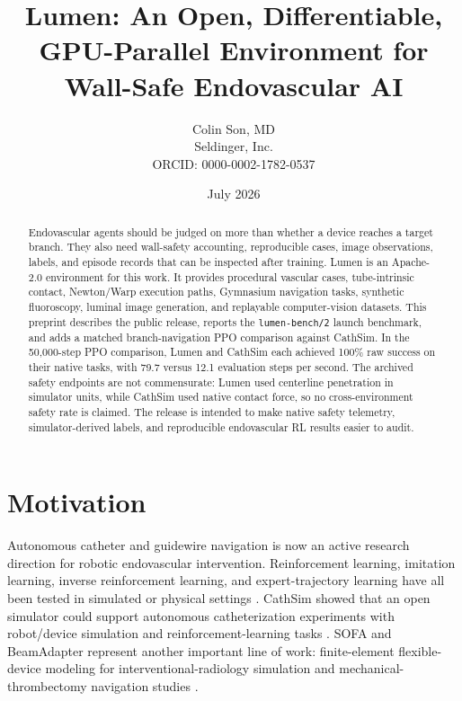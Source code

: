 \documentclass[11pt]{article}
\title{\textbf{Lumen: An Open, Differentiable, GPU-Parallel Environment for Wall-Safe Endovascular AI}}
\author{
  Colin Son, MD\\
  Seldinger, Inc.\\
  ORCID: 0000-0002-1782-0537
}
\date{July 2026}
\begin{document}
\maketitle

\begin{abstract}
Endovascular agents should be judged on more than whether a device reaches a target branch. They also need wall-safety accounting, reproducible cases, image observations, labels, and episode records that can be inspected after training. Lumen is an Apache-2.0 environment for this work. It provides procedural vascular cases, tube-intrinsic contact, Newton/Warp execution paths, Gymnasium navigation tasks, synthetic fluoroscopy, luminal image generation, and replayable computer-vision datasets. This preprint describes the public release, reports the \texttt{lumen-bench/2} launch benchmark, and adds a matched branch-navigation PPO comparison against CathSim. In the 50,000-step PPO comparison, Lumen and CathSim each achieved 100\% raw success on their native tasks, with 79.7 versus 12.1 evaluation steps per second. The archived safety endpoints are not commensurate: Lumen used centerline penetration in simulator units, while CathSim used native contact force, so no cross-environment safety rate is claimed. The release is intended to make native safety telemetry, simulator-derived labels, and reproducible endovascular RL results easier to audit.
\end{abstract}

\section{Motivation}

Autonomous catheter and guidewire navigation is now an active research direction for robotic endovascular intervention. Reinforcement learning, imitation learning, inverse reinforcement learning, and expert-trajectory learning have all been tested in simulated or physical settings \cite{robertshaw2023systematic,robertshaw2024mt,jianu2022cathsim,jianu2024cathsim,jianu2024expert,iagn2024}. CathSim showed that an open simulator could support autonomous catheterization experiments with robot/device simulation and reinforcement-learning tasks \cite{jianu2022cathsim,jianu2024cathsim}. SOFA and BeamAdapter represent another important line of work: finite-element flexible-device modeling for interventional-radiology simulation and mechanical-thrombectomy navigation studies \cite{allard2007sofa,beamadapter,robertshaw2024mt}.
\end{document}
